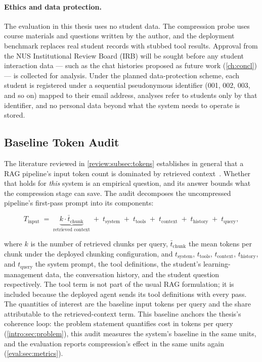 \paragraph{Ethics and data protection.} The evaluation in this thesis uses
no student data. The compression probe uses course materials and questions
written by the author, and the deployment benchmark replaces real student
records with stubbed tool results. Approval from the NUS Institutional
Review Board (IRB) will be sought before any student interaction data --- such
as the chat histories proposed as future work (\autoref{ch:concl}) --- is
collected for analysis. Under the planned data-protection scheme, each
student is registered under a sequential pseudonymous identifier (001, 002,
003, and so on) mapped to their email address, analyses refer to students
only by that identifier, and no personal data beyond what the system needs
to operate is stored.

\subsection{Baseline Token Audit}
\label{design:subsec:tokenaudit}

The literature reviewed in \autoref{review:subsec:tokens} establishes in
general that a RAG pipeline's input token count is dominated by retrieved
context~\cite{femnlp23:Liu}. Whether that holds for \emph{this} system is an
empirical question, and its answer bounds what the compression stage can
save. The audit decomposes the uncompressed pipeline's first-pass prompt into
its components:

\begin{equation}
  \label{design:eq:tokenaudit}
  T_{\mathrm{input}}
    \;=\;
  \underbrace{k \cdot \bar{t}_{\mathrm{chunk}}}_{\text{retrieved context}}
  \;+\; t_{\mathrm{system}}
  \;+\; t_{\mathrm{tools}}
  \;+\; t_{\mathrm{context}}
  \;+\; t_{\mathrm{history}}
  \;+\; t_{\mathrm{query}},
\end{equation}

where $k$ is the number of retrieved chunks per query,
$\bar{t}_{\mathrm{chunk}}$ the mean tokens per chunk under the deployed
chunking configuration, and $t_{\mathrm{system}}$, $t_{\mathrm{tools}}$,
$t_{\mathrm{context}}$, $t_{\mathrm{history}}$, and $t_{\mathrm{query}}$ the
system prompt, the tool definitions, the student's learning-management data,
the conversation history, and the student question respectively. The tool
term is not part of the usual RAG formulation; it is included because the
deployed agent sends its tool definitions with every pass. The quantities of
interest are the baseline input tokens per query and the share attributable
to the retrieved-context term. This baseline anchors the thesis's coherence
loop: the problem statement quantifies cost in tokens per query
(\autoref{intro:sec:problem}), this audit measures the system's baseline in
the same units, and the evaluation reports compression's effect in the same
units again (\autoref{eval:sec:metrics}).

